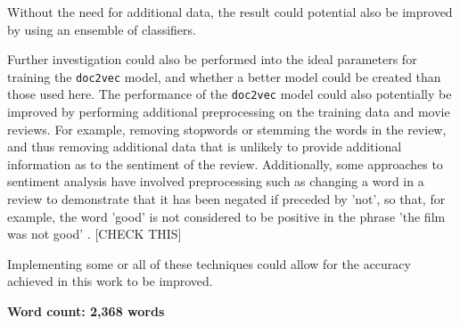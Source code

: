 \documentclass[twocolumn]{article}
\begin{document}
Without the need for additional data, the result could potential also be improved by using an ensemble of classifiers.

Further investigation could also be performed into the ideal parameters for training the \texttt{doc2vec} model, and whether a better model could be created than those used here. The performance of the \texttt{doc2vec} model could also potentially be improved by performing additional preprocessing on the training data and movie reviews. For example, removing stopwords or stemming the words in the review, and thus removing additional data that is unlikely to provide additional information as to the sentiment of the review. Additionally, some approaches to sentiment analysis have involved preprocessing such as changing a word in a review to demonstrate that it has been negated if preceded by 'not', so that, for example, the word 'good' is not considered to be positive in the phrase 'the film was not good' \cite{pang}. [CHECK THIS]

Implementing some or all of these techniques could allow for the accuracy achieved in this work to be improved.


\textbf{Word count: 2,368 words}

{}

\end{document}

